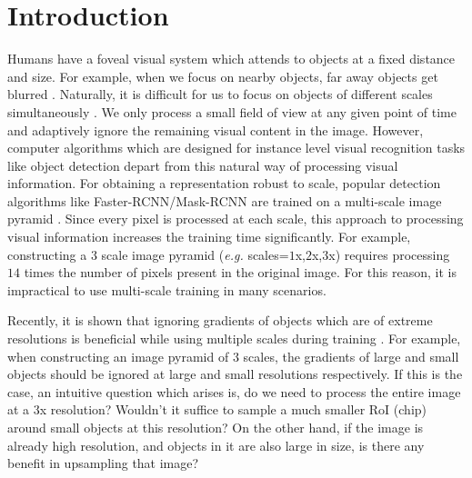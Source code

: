 \documentclass{article}
\begin{document}
\section{Introduction}
Humans have a foveal visual system which attends to objects at a fixed distance and size. For example, when we focus on nearby objects, far away objects get blurred \cite{corbetta2002control}. Naturally, it is difficult for us to focus on objects of different scales simultaneously \cite{rensink2000dynamic}. We only process a small field of view at any given point of time and adaptively ignore the remaining visual content in the image. However, computer algorithms which are designed for instance level visual recognition tasks like object detection depart from this natural way of processing visual information. For obtaining a representation robust to scale, popular detection algorithms like Faster-RCNN/Mask-RCNN \cite{ren2015faster,he2017mask} are trained on a multi-scale image pyramid \cite{liu2018path,singh2017analysis}. Since every pixel is processed at each scale, this approach to processing visual information increases the training time significantly. For example, constructing a $3$ scale image pyramid (\textit{e.g.} scales=$1$x,$2$x,$3$x) requires processing $14$ times the number of pixels present in the original image. For this reason, it is impractical to use multi-scale training in many scenarios. 

Recently, it is shown that ignoring gradients of objects which are of extreme resolutions is beneficial while using multiple scales during training \cite{singh2017analysis}. For example, when constructing an image pyramid of $3$ scales, the gradients of large and small objects should be ignored at large and small resolutions respectively. If this is the case, an intuitive question which arises is, do we need to process the entire image at a $3$x resolution? Wouldn’t it suffice to sample a much smaller RoI (chip) around small objects at this resolution? On the other hand, if the image is already high resolution, and objects in it are also large in size, is there any benefit in upsampling that image? 
\end{document}
